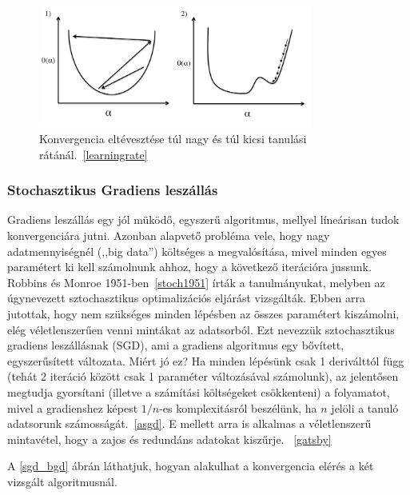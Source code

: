 \documentclass[a4paper,12pt]{article}
\begin{document}
\begin{figure}[ht!]
\centering
\includegraphics[width=90mm]{img/alfa.png}
\caption{Konvergencia eltévesztése túl nagy és túl kicsi tanulási rátánál.~\ref{learningrate} \label{alfa}}
\end{figure}

\subsubsection{Stochasztikus Gradiens leszállás}

Gradiens leszállás egy jól müködő, egyszerű algoritmus, mellyel líneárisan tudok konvergenciára jutni. Azonban alapvető probléma vele, hogy nagy adatmennyiségnél (,,big data'') költséges a megvalósítása, mivel minden egyes paramétert ki kell számolnunk ahhoz, hogy a következő iterációra jussunk. Robbins és Monroe 1951-ben~\ref{stoch1951} írták a tanulmányukat, melyben az úgynevezett sztochasztikus optimalizációs eljárást vizsgálták. Ebben arra jutottak, hogy nem szükséges minden lépésben az összes paramétert kiszámolni, elég véletlenszerűen venni mintákat az adatsorból. Ezt nevezzük sztochasztikus gradiens leszállásnak (SGD), ami a gradiens algoritmus egy bővített, egyszerűsített változata. \linebreak
Miért jó ez? Ha minden lépésünk csak 1 deriválttól függ (tehát 2 iteráció között csak 1 paraméter változásával számolunk), az jelentősen megtudja gyorsítani (illetve a számítási költségeket csökkenteni) a folyamatot, mivel a gradienshez képest $1/n$-es komplexitásról beszélünk, ha $n$ jelöli a tanuló adatsorunk számosságát.~\ref{asgd}. E mellett arra is alkalmas a véletlenszerű mintavétel, hogy a zajos és redundáns adatokat kiszűrje. ~\ref{gatsby} \linebreak

A \ref{sgd_bgd} ábrán láthatjuk, hogyan alakulhat a konvergencia elérés a két vizsgált algoritmusnál. 
\end{document}

